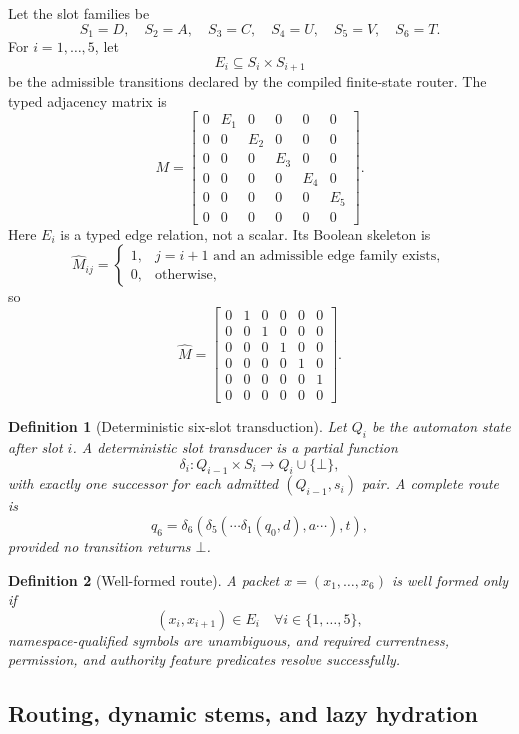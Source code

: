\documentclass[11pt]{article}
\newtheorem{definition}{Definition}
\begin{document}
Let the slot families be
\[
S_1=D,\quad S_2=A,\quad S_3=C,\quad S_4=U,\quad S_5=V,\quad S_6=T.
\]
For \(i=1,\ldots,5\), let
\[
E_i\subseteq S_i\times S_{i+1}
\]
be the admissible transitions declared by the compiled finite-state router.  The
typed adjacency matrix is
\[
M=
\begin{bmatrix}
0&E_1&0&0&0&0\\
0&0&E_2&0&0&0\\
0&0&0&E_3&0&0\\
0&0&0&0&E_4&0\\
0&0&0&0&0&E_5\\
0&0&0&0&0&0
\end{bmatrix}.
\]
Here \(E_i\) is a typed edge relation, not a scalar.  Its Boolean skeleton is
\[
\widehat{M}_{ij}=
\begin{cases}
1,&j=i+1\text{ and an admissible edge family exists},\\
0,&\text{otherwise},
\end{cases}
\]
so
\[
\widehat M=
\begin{bmatrix}
0&1&0&0&0&0\\
0&0&1&0&0&0\\
0&0&0&1&0&0\\
0&0&0&0&1&0\\
0&0&0&0&0&1\\
0&0&0&0&0&0
\end{bmatrix}.
\]

\begin{definition}[Deterministic six-slot transduction]
Let \(Q_i\) be the automaton state after slot \(i\).  A deterministic slot
transducer is a partial function
\[
\delta_i:Q_{i-1}\times S_i\rightarrow Q_i\cup\{\bot\},
\]
with exactly one successor for each admitted \((Q_{i-1},s_i)\) pair.  A complete
route is
\[
q_6=\delta_6(\delta_5(\cdots\delta_1(q_0,d),a\cdots),t),
\]
provided no transition returns \(\bot\).
\end{definition}

\begin{definition}[Well-formed route]
A packet \(x=(x_1,\ldots,x_6)\) is well formed only if
\[
(x_i,x_{i+1})\in E_i\quad\forall i\in\{1,\ldots,5\},
\]
namespace-qualified symbols are unambiguous, and required currentness,
permission, and authority feature predicates resolve successfully.
\end{definition}

\subsection{Routing, dynamic stems, and lazy hydration}
\end{document}
